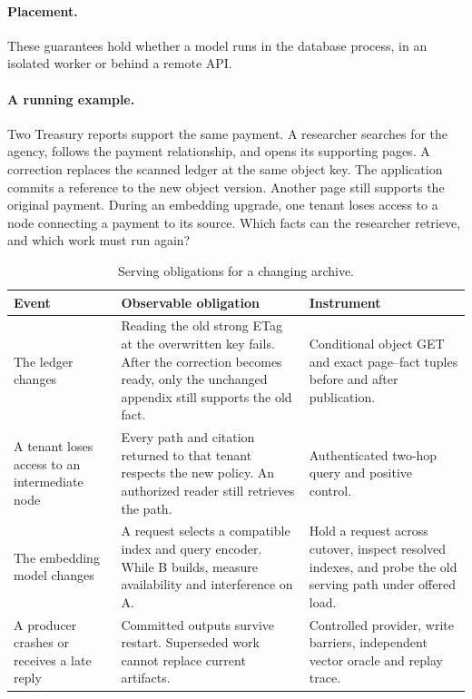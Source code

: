 \documentclass[sigconf,nonacm]{acmart}
\begin{document}
\paragraph{Placement.} These guarantees hold whether a model runs in the
database process, in an isolated worker or behind a remote API.

\paragraph{A running example.} Two Treasury reports support the same payment.
A researcher searches for the agency, follows the payment relationship, and
opens its supporting pages. A correction replaces the scanned ledger at the
same object key. The application commits a reference to the new object
version. Another page still supports the original payment. During an embedding
upgrade, one tenant loses access to a node connecting a payment to its source.
Which facts can the researcher retrieve, and which work must run again?

\begin{table}[t]
  \caption{Serving obligations for a changing archive.}
  \label{tab:invariants}
  \small
  \begin{tabularx}{\textwidth}{@{}p{}LL@{}}
    \toprule
    Event & Observable obligation & Instrument \\
    \midrule
    The ledger changes & Reading the old strong ETag at the overwritten key fails. After the correction becomes ready, only the unchanged appendix still supports the old fact. & Conditional object GET and exact page--fact tuples before and after publication. \\
    A tenant loses access to an intermediate node & Every path and citation returned to that tenant respects the new policy. An authorized reader still retrieves the path. & Authenticated two-hop query and positive control. \\
    The embedding model changes & A request selects a compatible index and query encoder. While B builds, measure availability and interference on A. & Hold a request across cutover, inspect resolved indexes, and probe the old serving path under offered load. \\
    A producer crashes or receives a late reply & Committed outputs survive restart. Superseded work cannot replace current artifacts. & Controlled provider, write barriers, independent vector oracle and replay trace. \\
    \bottomrule
  \end{tabularx}
\end{table}
\end{document}
